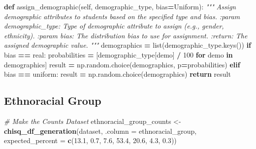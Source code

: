 \documentclass[
  twocolumn]{article}
\newenvironment{Shaded}{\begin{snugshade}}{\end{snugshade}}
\newcommand{\AttributeTok}[1]{\textcolor[rgb]{0.13,0.29,0.53}{#1}}
\newcommand{\BuiltInTok}[1]{#1}
\newcommand{\CommentTok}[1]{\textcolor[rgb]{0.56,0.35,0.01}{\textit{#1}}}
\newcommand{\ControlFlowTok}[1]{\textcolor[rgb]{0.13,0.29,0.53}{\textbf{#1}}}
\newcommand{\DecValTok}[1]{\textcolor[rgb]{0.00,0.00,0.81}{#1}}
\newcommand{\FloatTok}[1]{\textcolor[rgb]{0.00,0.00,0.81}{#1}}
\newcommand{\FunctionTok}[1]{\textcolor[rgb]{0.13,0.29,0.53}{\textbf{#1}}}
\newcommand{\KeywordTok}[1]{\textcolor[rgb]{0.13,0.29,0.53}{\textbf{#1}}}
\newcommand{\NormalTok}[1]{#1}
\newcommand{\OperatorTok}[1]{\textcolor[rgb]{0.81,0.36,0.00}{\textbf{#1}}}
\newcommand{\OtherTok}[1]{\textcolor[rgb]{0.56,0.35,0.01}{#1}}
\newcommand{\StringTok}[1]{\textcolor[rgb]{0.31,0.60,0.02}{#1}}
\newcommand{\VariableTok}[1]{\textcolor[rgb]{0.00,0.00,0.00}{#1}}
\begin{document}
\begin{Shaded}
\begin{Highlighting}[]
\KeywordTok{def}\NormalTok{ assign\_demographic(}\VariableTok{self}\NormalTok{, demographic\_type, bias}\OperatorTok{=}\StringTok{\textquotesingle{}Uniform\textquotesingle{}}\NormalTok{):}
        \CommentTok{"""}
\CommentTok{        Assign demographic attributes to students based on the specified type and bias.}
\CommentTok{        :param demographic\_type: Type of demographic attribute to assign (e.g., gender, ethnicity).}
\CommentTok{        :param bias: The distribution bias to use for assignment.}
\CommentTok{        :return: The assigned demographic value.}
\CommentTok{        """}
\NormalTok{        demographics }\OperatorTok{=} \BuiltInTok{list}\NormalTok{(demographic\_type.keys())}
        \ControlFlowTok{if}\NormalTok{ bias }\OperatorTok{==} \StringTok{\textquotesingle{}real\textquotesingle{}}\NormalTok{:}
\NormalTok{            probabilities }\OperatorTok{=}\NormalTok{ [demographic\_type[demo] }\OperatorTok{/} \DecValTok{100} \ControlFlowTok{for}\NormalTok{ demo }\KeywordTok{in}\NormalTok{ demographics]}
\NormalTok{            result }\OperatorTok{=}\NormalTok{ np.random.choice(demographics, p}\OperatorTok{=}\NormalTok{probabilities)}
        \ControlFlowTok{elif}\NormalTok{ bias }\OperatorTok{==} \StringTok{\textquotesingle{}uniform\textquotesingle{}}\NormalTok{:}
\NormalTok{            result }\OperatorTok{=}\NormalTok{ np.random.choice(demographics)}
        \ControlFlowTok{return}\NormalTok{ result}
\end{Highlighting}
\end{Shaded}

\subsection{Ethnoracial Group}\label{ethnoracial-group}

\begin{Shaded}
\begin{Highlighting}[]
\CommentTok{\# Make the Counts Dataset}
\NormalTok{ethnoracial\_group\_counts }\OtherTok{\textless{}{-}} \FunctionTok{chisq\_df\_generation}\NormalTok{(dataset, }\AttributeTok{.column =}\NormalTok{ ethnoracial\_group, }\AttributeTok{expected\_percent =} \FunctionTok{c}\NormalTok{(}\FloatTok{13.1}\NormalTok{, }\FloatTok{0.7}\NormalTok{, }\FloatTok{7.6}\NormalTok{, }\FloatTok{53.4}\NormalTok{, }\FloatTok{20.6}\NormalTok{, }\FloatTok{4.3}\NormalTok{, }\FloatTok{0.3}\NormalTok{))}
\end{Highlighting}
\end{Shaded}
\end{document}
